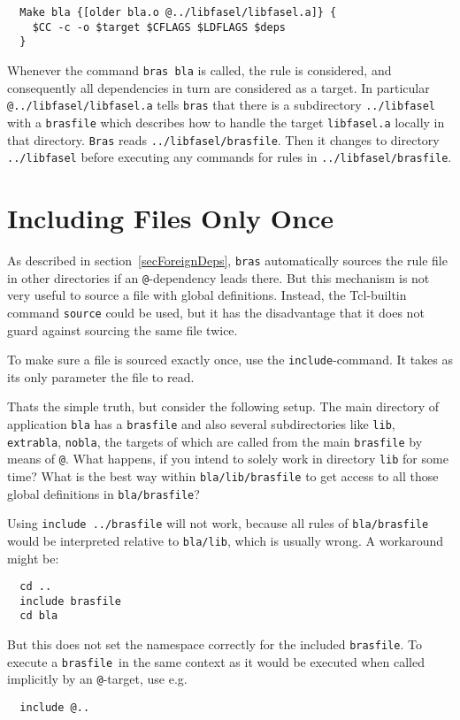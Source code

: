 \documentclass[11pt,bibtotoc,idxtotoc]{scrreprt}
\makeatletter
\newcommand{\bras}{\texttt{bras}}
\newcommand{\Bras}{\texttt{Bras}}
\newcommand{\brasfile}{\texttt{brasfile}}
\newcommand{\indextt}[1]{\index{#1@\texttt{#1}}}
\newcommand{\Indextt}[1]{\texttt{#1}\index{#1@\texttt{#1}}}
\makeatother
\begin{document}
\begin{verbatim}
  Make bla {[older bla.o @../libfasel/libfasel.a]} {
    $CC -c -o $target $CFLAGS $LDFLAGS $deps
  }
\end{verbatim}

Whenever the command \texttt{bras bla} is called, the rule is
considered, and consequently all dependencies in turn are considered
as a target. In particular \texttt{@../libfasel/lib\-fasel.a} tells
\bras{} that there is a subdirectory \texttt{../libfasel} with a
\texttt{brasfile} which describes how to handle the target
\texttt{libfasel.a} locally in that directory. \Bras{} reads
\texttt{../libfasel/bras\-file}. Then it changes to directory
\texttt{../libfasel} before executing any commands for rules in
\texttt{../libfasel/brasfile}.

\section{Including Files Only Once}
\label{secInclude}

As described in section~\ref{secForeignDeps}, \bras{} automatically
sources the rule file in other directories if an
\texttt{@}-dependency leads there. But this
mechanism is not very useful to source a file with global definitions.
Instead, the Tcl-builtin command \Indextt{source} could be used, but
it has the disadvantage that it does not guard against sourcing the
same file twice.

To make sure a file is sourced exactly once, use the
\Indextt{include}-command. It takes as its only parameter the file to
read.

Thats the simple truth, but consider the following setup. The main
directory of application \texttt{bla} has a \texttt{brasfile} and also
several subdirectories like \texttt{lib}, \texttt{extrabla},
\texttt{nobla}, the targets of which are called from the main
\texttt{brasfile} by means of \texttt{@}. What happens, if you
intend to solely work in directory \texttt{lib} for some time?  What
is the best way within \texttt{bla/lib/brasfile} to get access to all
those global definitions in
\texttt{bla/brasfile}?

Using \texttt{include ../brasfile} will not work, because all
rules of \texttt{bla/brasfile} would be interpreted relative to
\texttt{bla/lib}, which is usually wrong. A workaround might be:
\begin{verbatim}
  cd ..
  include brasfile
  cd bla
\end{verbatim}
But this does not set the namespace correctly for the included
\brasfile. To execute a \brasfile\ in the same context as it would be
executed when called implicitly by an \texttt{@}-target, use e.g.
\begin{verbatim}
  include @..
\end{verbatim}
\indextt{"@..}
\end{document}
